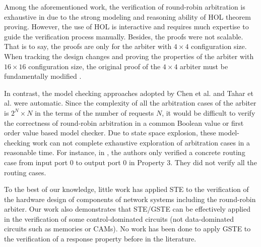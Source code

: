 \documentclass[final]{IEEEtran}
\begin{document}
Among the aforementioned work, the verification of round-robin
arbitration is exhaustive in \cite{Paul94, PaulTech94} due to the
strong modeling and reasoning ability of HOL theorem proving.
However, the use of HOL is interactive and requires much expertise
to guide the verification process manually. Besides, the proofs were
not scalable. That is to say, the proofs are only for the arbiter
with $4 \times 4$ configuration size. When tracking the design
changes and proving the properties of the arbiter with $16 \times
16$ configuration size, the original proof of the $4 \times 4$
arbiter must be fundamentally modified \cite{CurzonATM}.%

 In contrast, the model checking approaches adopted by Chen et al. and Tahar et al. were
automatic. Since the complexity of all the arbitration cases of the
arbiter is $2^{N}\times N$ in the terms of the number of requests
$N$, it would be difficult to verify the correctness of round-robin
arbitration in a common Boolean value or first order value based
model checker. Due to state space explosion, these model-checking
work can not complete exhaustive exploration of arbitration cases in a reasonable time.
For instance, in \cite{DBLP:journals/tcad/TaharSCZLM99}, the authors
only verified a concrete routing case from input port 0 to output
port 0 in Property 3. They did not verify all the routing cases.

To the best of our knowledge, little work has applied STE to the
verification of the hardware design of components of network systems
including the round-robin arbiter. Our work also demonstrates that
STE/GSTE can be effectively applied in the verification of some
control-dominated circuits (not data-dominated circuits such as
memories or CAMs). No work has been done to apply GSTE to the
verification of a response property before in the literature.


\end{document}
